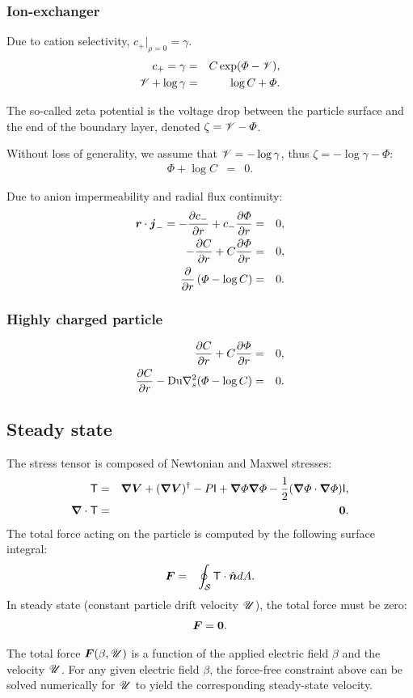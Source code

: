 \subsubsection{Ion-exchanger}

Due to cation selectivity, $c_+|_{\rho=0} = \gamma$.
\begin{eqnarray}
  c_+ = \gamma &=& C \exp(\varPhi - \mathscr{V}), \\
  \mathscr{V} + \log \gamma &=& \log C + \varPhi.
\end{eqnarray}

The so-called zeta potential is 
the voltage drop between the particle surface and the end of
the boundary layer, denoted $\zeta = \mathscr{V} - \varPhi$. 

Without loss of generality, 
we assume that $\mathscr{V} = -\log\gamma$, thus $\zeta = -\log\gamma-\varPhi$:
\begin{eqnarray}
\varPhi + \log C &=& 0.
\end{eqnarray}

Due to anion impermeability and radial flux continuity:
\begin{eqnarray}
  \boldsymbol{r} \cdot \boldsymbol{j}_- = -\frac{\partial c_-}{\partial r} + c_- \frac{\partial \varPhi}{\partial r} &=& 0, \\
-\frac{\partial C}{\partial r} + C \frac{\partial \varPhi}{\partial r} &=& 0, \\
\frac{\partial }{\partial r}\left(\varPhi - \log C\right) &=& 0.
\end{eqnarray}

\subsubsection{Highly charged particle}
\begin{eqnarray}
 \frac{\partial C}{\partial r} + C \frac{\partial \varPhi}{\partial r} &=& 0, \\
 \frac{\partial C}{\partial r} - \mbox{Du} \nabla^2_s (\varPhi - \log C) &=& 0.
\end{eqnarray}


\subsection{Steady state}
The stress tensor is composed of Newtonian and Maxwel stresses:
\begin{eqnarray}
\mathsf{T} &=& \boldsymbol{\nabla} \boldsymbol{V} + (\boldsymbol{\nabla} \boldsymbol{V})^\dagger - P \mathsf{I}
+ \boldsymbol{\nabla} \varPhi \boldsymbol{\nabla} \varPhi - \frac{1}{2} (\boldsymbol{\nabla} \varPhi \cdot \boldsymbol{\nabla} \varPhi) \mathsf{I}, \\
\boldsymbol{\nabla} \cdot \mathsf{T} &=& \boldsymbol{0}.
\end{eqnarray}
The total force acting on the particle is computed by the following surface integral:
\begin{eqnarray}
\boldsymbol{F} &=& \oint_\mathcal{S} \mathsf{T} \cdot \hat{\boldsymbol{n}} dA.
\end{eqnarray}
In steady state (constant particle drift velocity $\mathscr{U}$), 
the total force must be zero: 
\begin{eqnarray}
\boldsymbol{F} = \boldsymbol{0}.
\end{eqnarray}

The total force $\boldsymbol{F}(\beta, \mathscr{U})$ is a function of the applied electric field $\beta$ and
the velocity $\mathscr{U}$.
For any given electric field $\beta$, the force-free constraint above 
can be solved numerically for $\mathscr{U}$ to
yield the corresponding steady-state velocity.
